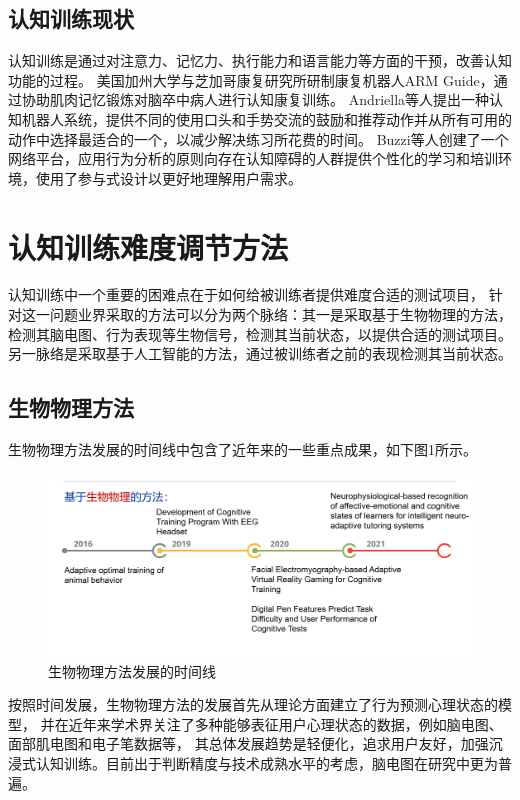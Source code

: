 \documentclass[12pt]{article}
\begin{document}
        \subsection{认知训练现状}

        认知训练是通过对注意力、记忆力、执行能力和语言能力等方面的干预，改善认知功能的过程。
        美国加州大学与芝加哥康复研究所研制康复机器人ARM Guide，通过协助肌肉记忆锻炼对脑卒中病人进行认知康复训练。
        Andriella等人\cite{ref5}提出一种认知机器人系统，提供不同的使用口头和手势交流的鼓励和推荐动作并从所有可用的动作中选择最适合的一个，以减少解决练习所花费的时间。
        Buzzi等人\cite{ref6}创建了一个网络平台，应用行为分析的原则向存在认知障碍的人群提供个性化的学习和培训环境，使用了参与式设计以更好地理解用户需求。
            \section{认知训练难度调节方法}
            认知训练中一个重要的困难点在于如何给被训练者提供难度合适的测试项目，
            针对这一问题业界采取的方法可以分为两个脉络：其一是采取基于生物物理的方法，
            检测其脑电图、行为表现等生物信号，检测其当前状态，以提供合适的测试项目。
            另一脉络是采取基于人工智能的方法，通过被训练者之前的表现检测其当前状态。
        \subsection{生物物理方法}
        生物物理方法发展的时间线中包含了近年来的一些重点成果，如下图1所示。
            \begin{figure}[H]
            	\centering
            	\includegraphics[width=1.0\textwidth]{images/timeline_bio.png}
            	\caption{生物物理方法发展的时间线}
            	\label{fig:label}
            \end{figure}
        按照时间发展，生物物理方法的发展首先从理论方面建立了行为预测心理状态的模型\cite{ref7}，
        并在近年来学术界关注了多种能够表征用户心理状态的数据，例如脑电图\cite{ref8}、面部肌电图和电子笔数据等，
        其总体发展趋势是轻便化，追求用户友好，加强沉浸式认知训练。目前出于判断精度与技术成熟水平的考虑，脑电图在研究中更为普遍。
\end{document}
